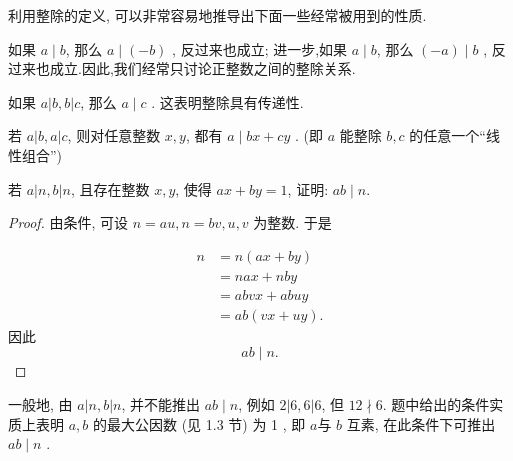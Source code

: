 利用整除的定义, 可以非常容易地推导出下面一些经常被用到的性质.

\begin{property}
	如果 $a \mid b$, 那么 $a \mid(-b)$ , 反过来也成立; 进一步,如果 $a \mid b$, 那么 $(-a) \mid b$ , 反过来也成立.因此,我们经常只讨论正整数之间的整除关系.
\end{property}


\begin{property}
	如果 $a|b, b| c$, 那么 $a \mid c$ . 这表明整除具有传递性.
\end{property}

\begin{property}\label{prop:整除的性质——“线性组合”}
	若 $a|b, a| c$, 则对任意整数 $x ,  y$, 都有 $a \mid b x+c y$ . (即 $a$ 能整除 $b ,  c$ 的任意一个“线性组合”)
\end{property}

\begin{example}\label{ex:整除的概念与基本性质-例1}
	若 $a|n, b| n$, 且存在整数 $x ,  y$, 使得 $a x+b y=1$, 证明: $a b \mid n$.
\end{example}
\begin{proof}
	由条件, 可设 $n=a u, n=b v, u ,  v$ 为整数. 于是

	\begin{align*}
		n & =n(a x+b y)      \\
		  & =n a x+n b y     \\
		  & =a b v x+a b u y \\
		  & =a b(v x+u y).
	\end{align*}
	因此
	\begin{equation*}
		a b \mid n.
	\end{equation*}
\end{proof}
\begin{note}
	一般地, 由 $a|n, b| n$, 并不能推出 $a b \mid n$, 例如 $2|6,6| 6$, 但 $12 \nmid 6$. 题中给出的条件实质上表明 $a ,  b$ 的最大公因数 (见 1.3 节) 为 1 , 即 $a$与 $b$ 互素, 在此条件下可推出 $a b \mid n$ .
\end{note}

